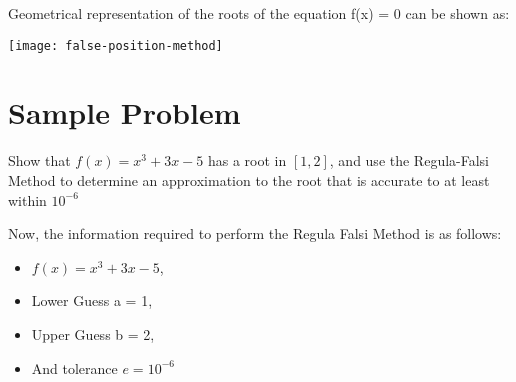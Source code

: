 \documentclass{article}
\begin{document}
  \pagebreak
  
 Geometrical representation of the roots of the equation f(x) = 0 can be shown as:
 
 \texttt{[image: false-position-method]}
 
 \section*{Sample Problem}
 Show that $f(x) = x^3 + 3x - 5$ has a root in $[1,2]$, and use the Regula-Falsi Method to determine an approximation to the root that is accurate to at least within $10^{-6}$
 
 Now, the information required to perform the Regula Falsi Method is as follows:
\begin{itemize} 
    \item $f(x) = x^3 + 3x - 5$,
    \item Lower Guess a = 1,
    \item Upper Guess b = 2,
    \item And tolerance $e = 10^{-6}$
\end{itemize}
\end{document}
